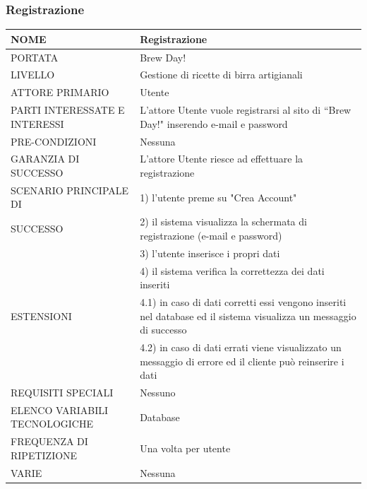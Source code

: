\documentclass[a4paper, titlepage]{article}
\begin{document}
\subsubsection{Registrazione}
\begin{longtable}{p{6cm}p{7cm}}\toprule
    NOME & Registrazione\\\midrule
    PORTATA & Brew Day!\\\midrule
    LIVELLO & Gestione di ricette di birra artigianali\\\midrule
    ATTORE PRIMARIO & Utente\\\midrule
    PARTI INTERESSATE E INTERESSI & L’attore Utente vuole registrarsi al sito di “Brew Day!" inserendo e-mail e password\\\midrule
    PRE-CONDIZIONI & Nessuna\\\midrule
    GARANZIA DI SUCCESSO & L’attore Utente riesce ad effettuare la registrazione\\\midrule
    SCENARIO PRINCIPALE DI
    & 1) l’utente preme su "Crea Account"\\
    SUCCESSO & 2) il sistema visualizza la schermata di registrazione (e-mail e password)\\
    & 3) l’utente inserisce i propri dati\\
    & 4) il sistema   verifica la correttezza dei dati inseriti\\\midrule
    ESTENSIONI
    & 4.1) in caso di dati corretti essi vengono inseriti
    nel database ed il sistema visualizza un messaggio di successo\\
    & 4.2) in caso di dati errati viene visualizzato un messaggio di errore ed il cliente può reinserire i dati\\\midrule
    REQUISITI SPECIALI & Nessuno\\\midrule
    ELENCO VARIABILI TECNOLOGICHE & Database\\\midrule
    FREQUENZA DI RIPETIZIONE & Una volta per utente\\\midrule
    VARIE & Nessuna\\\bottomrule                                
\end{longtable}
\newpage
\vphantom{}
\end{document}
